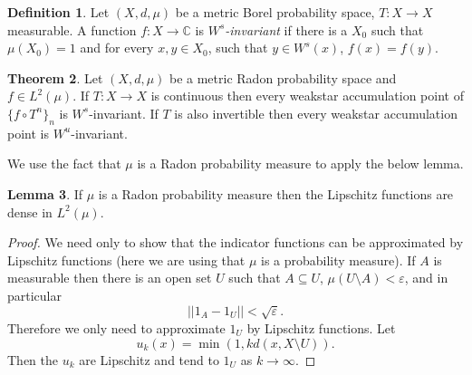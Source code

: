 \documentclass[12pt]{report}
\newcommand{\CC}{\mathbb{C}}
\newcommand{\dfn}[1]{\emph{#1}\index{#1}}
\theoremstyle{definition}
\newtheorem{theorem}{Theorem}[chapter]
\newtheorem{lemma}[theorem]{Lemma}
\newtheorem{definition}[theorem]{Definition}
\begin{document}
\begin{definition}
Let $(X, d, \mu)$ be a metric Borel probability space, $T: X \to X$ measurable. A function $f: X \to \CC$ is \dfn{$W^s$-invariant} if there is a $X_0$ such that $\mu(X_0) = 1$ and for every $x, y \in X_0$, such that $y \in W^s(x)$, $f(x) = f(y)$.
\end{definition}
\begin{theorem}
\label{weakstar accumulation}
Let $(X, d, \mu)$ be a metric Radon probability space and $f \in L^2(\mu)$. If $T: X \to X$ is continuous then every weakstar accumulation point of $\{f \circ T^n\}_n$ is $W^s$-invariant. If $T$ is also invertible then every weakstar accumulation point is $W^u$-invariant.
\end{theorem}
We use the fact that $\mu$ is a Radon probability measure to apply the below lemma.
\begin{lemma}
\label{lipschitz is l2 dense}
If $\mu$ is a Radon probability measure then the Lipschitz functions are dense in $L^2(\mu)$.
\end{lemma}
\begin{proof}
We need only to show that the indicator functions can be approximated by Lipschitz functions (here we are using that $\mu$ is a probability measure). If $A$ is measurable then there is an  open set $U$ such that $A \subseteq U$, $\mu(U \setminus A) < \varepsilon$, and in particular
$$||1_A - 1_U|| < \sqrt \varepsilon.$$
Therefore we only need to approximate $1_U$ by Lipschitz functions. Let
$$u_k(x) = \min(1, kd(x, X \setminus U)).$$
Then the $u_k$ are Lipschitz and tend to $1_U$ as $k \to \infty$.
\end{proof}
\end{document}
